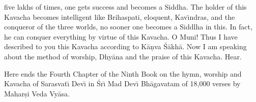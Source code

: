 five lakhs of times, one gets success and becomes a Siddha. The holder of this Kavacha becomes intelligent like Brihaspati, eloquent, Kav\={\i}ndras, and the conqueror of the three worlds, no sooner one becomes a Siddlha in this. In fact, he can conquer everything by virtue of this Kavacha. O Muni! Thus I have described to you this Kavacha according to K\=a\d{n}va \'S\=akh\=a. Now I am speaking about the method of worship, Dhy\=ana and the praise of this Kavacha. Hear.

Here ends the Fourth Chapter of the Ninth Book on the hymn, worship and Kavacha of Sarasvat\={\i} Dev\={\i} in \'Sr\={\i} Mad Dev\={\i} Bh\=agavatam of 18,000 verses by Mahar\d{s}i Veda Vy\=asa.



